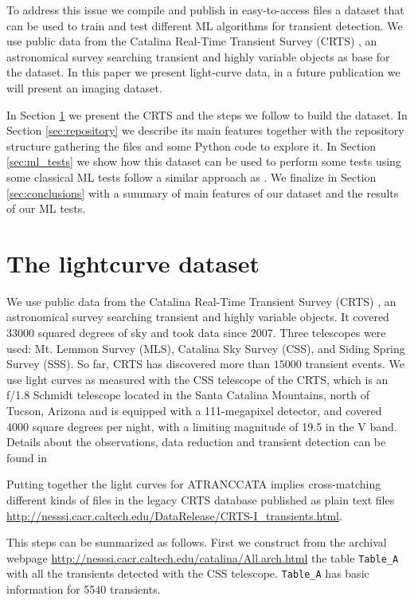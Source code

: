 \documentclass[a4paper,fleqn,usenatbib]{mnras}
\begin{document}
To address this issue we compile and publish in easy-to-access files a
dataset that can be used to train and test different ML algorithms for
transient detection.
We use public data from the Catalina Real-Time Transient Survey
(CRTS) \citep{1111.2566}, an astronomical survey searching transient
and highly variable objects as base for the dataset.
In this paper we present light-curve data, in a future publication we
will present an imaging dataset. 

In Section \ref{sec:data} we present the CRTS and the steps we follow
to build the dataset.
In Section \ref{sec:repository} we describe its main features together
with the repository structure gathering the files and some Python code  
to explore it.
In Section \ref{sec:ml_tests} we show how this dataset can be used to
perform some tests using some classical ML tests follow a similar
approach as \cite{1601.03931}.  
We finalize in Section \ref{sec:conclusions} with a summary of main
features of our dataset and the results of our ML tests.

\section{The lightcurve dataset} 
\label{sec:data}

We use public data from the Catalina Real-Time Transient Survey
(CRTS) \citep{2009ApJ...696..870D}, an astronomical survey searching transient
and highly variable objects.   
It covered 33000 squared degrees of sky and took data since 2007.
Three telescopes were used: Mt. Lemmon Survey (MLS), Catalina Sky
Survey (CSS), and Siding Spring Survey (SSS). So far, CRTS has
discovered more than $15000$ transient events.
We use light curves as measured with the CSS telescope of the CRTS, which is
an f/1.8 Schmidt telescope located in the Santa Catalina Mountains, north of Tucson,
Arizona and is equipped with a 111-megapixel  detector, and covered
4000 square degrees per night, with a limiting magnitude of 19.5 in
the V band.  
Details about the observations, data reduction and transient
detection can be found in \cite{2009ApJ...696..870D}

Putting together the light curves for ATRANCCATA implies
cross-matching different kinds of files  in the legacy CRTS database
published as plain text files
\url{http://nesssi.cacr.caltech.edu/DataRelease/CRTS-I_transients.html}. 

This steps can be summarized as follows.
First we construct from the archival webpage
\url{http://nesssi.cacr.caltech.edu/catalina/All.arch.html} the table
\verb"Table_A" with all the transients detected with the CSS
telescope. \verb"Table_A" has basic information for 5540 transients.  
\end{document}
